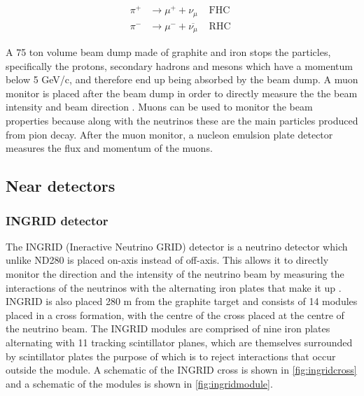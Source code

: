 \begin{equation}
\begin{array}{lll}
\pi^{+} & \longrightarrow \mu^{+}+\nu_{\mu} & \text { FHC } \\
\pi^{-} & \longrightarrow \mu^{-}+\overline{\nu_{\mu}} & \text { RHC }
\end{array}
\label{eq:nubeam}
\end{equation}

A 75 ton volume beam dump made of graphite and iron stops the particles, specifically the protons, secondary hadrons and mesons which have a momentum below 5 GeV/c, and therefore end up being absorbed by the beam dump. A muon monitor is placed after the beam dump in order to directly measure the the beam intensity and beam direction \cite{matsuoka2010design}. Muons can be used to monitor the beam properties because along with the neutrinos these are the main particles produced from pion decay. After the muon monitor, a nucleon emulsion plate detector measures the flux and momentum of the muons. 

\subsection{Near detectors}

\subsubsection{INGRID detector}

The INGRID (Ineractive Neutrino GRID) detector is a neutrino detector which unlike ND280 is placed on-axis instead of off-axis. This allows it to directly monitor the direction and the intensity of the neutrino beam by measuring the interactions of the neutrinos with the alternating iron plates that make it up \cite{otani2008design}. INGRID is also placed 280 m from the graphite target and consists of 14 modules placed in a cross formation, with the centre of the cross placed at the centre of the neutrino beam. The INGRID modules are comprised of nine iron plates alternating with 11 tracking scintillator planes, which are themselves surrounded by scintillator plates the purpose of which is to reject interactions that occur outside the module. A schematic of the INGRID cross is shown in \ref{fig:ingridcross} and a schematic of the modules is shown in \ref{fig:ingridmodule}. 

